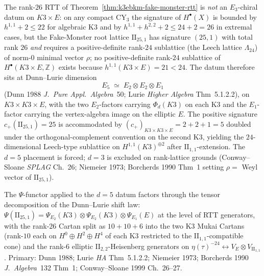 \begin{remark}[Dunn-Lurie routing: why the rank-$26$ RTT lives at \texorpdfstring{$d=5$}{d=5}]
\label{rem:k3ebkm-fake-monster-dunn-lurie}
The rank-$26$ RTT of Theorem~\ref{thm:k3ebkm-fake-monster-rtt} is
\emph{not} an $E_3$-chiral datum on $K3\times E$: on any compact
CY$_3$ the signature of $H^\bullet(X)$ is bounded by $h^{1,1} + 2 \le 22$
for algebraic K3 and by $h^{1,1} + h^{2,2} + 2 \le 24 + 2 = 26$ in
extremal cases, but the Fake-Monster root lattice $\mathrm{II}_{25,1}$
has signature $(25,1)$ with total rank $26$ \emph{and} requires a
positive-definite rank-$24$ sublattice (the Leech lattice
$\Lambda_{24}$) of norm-$0$ minimal vector $\rho$; no positive-definite
rank-$24$ sublattice of $H^\bullet(K3\times E, \mathbb Z)$ exists
because $h^{1,1}(K3\times E) = 21 < 24$. The datum therefore sits at
Dunn--Lurie dimension
\[
 E_5 \;\simeq\; E_2 \otimes E_2 \otimes E_1
\]
(Dunn 1988 \emph{J.\ Pure Appl.\ Algebra}~50; Lurie
\emph{Higher Algebra} Thm~5.1.2.2), on $K3 \times K3 \times E$, with the
two $E_2$-factors carrying $\Phi_d(K3)$ on each K3 and the $E_1$-factor
carrying the vertex-algebra image on the elliptic $E$. The positive
signature $c_+(\mathrm{II}_{25,1}) = 25$ is accommodated by
$(c_+)_{K3\times K3\times E} = 2 + 2 + 1 = 5$ doubled under the
orthogonal-complement convention on the second K3, yielding the
$24$-dimensional Leech-type sublattice on $H^{1,1}(K3)^{\oplus 2}$
after $\mathrm{II}_{1,1}$-extension. The $d = 5$ placement is forced;
$d = 3$ is excluded on rank-lattice grounds
(Conway--Sloane \emph{SPLAG} Ch.~26; Niemeier 1973; Borcherds 1990
Thm~1 setting $\rho = $ Weyl vector of $\mathrm{II}_{25,1}$).

The $\Psi$-functor applied to the $d = 5$ datum factors through the
tensor decomposition of the Dunn--Lurie shift law:
$\Psi(\mathrm{II}_{25,1}) = \Psi_{E_2}(K3)\otimes \Psi_{E_2}(K3)\otimes
\Psi_{E_1}(E)$ at the level of RTT generators, with the rank-$26$
Cartan split as $10 + 10 + 6$ into the two K3 Mukai Cartans (rank-$10$
each on $H^0\oplus H^2\oplus H^4$ of each K3 restricted to the
$\mathrm{II}_{1,1}$-compatible cone) and the rank-$6$ elliptic
$\mathrm{II}_{2,2}$-Heisenberg generators on
$\eta(\tau)^{-24} \leftrightarrow V_E\otimes V_{\mathrm{II}_{1,1}}$.
Primary: Dunn 1988; Lurie \emph{HA} Thm~5.1.2.2; Niemeier 1973;
Borcherds 1990 \emph{J.\ Algebra}~132 Thm~1; Conway--Sloane 1999
Ch.~26--27.
\end{remark}


